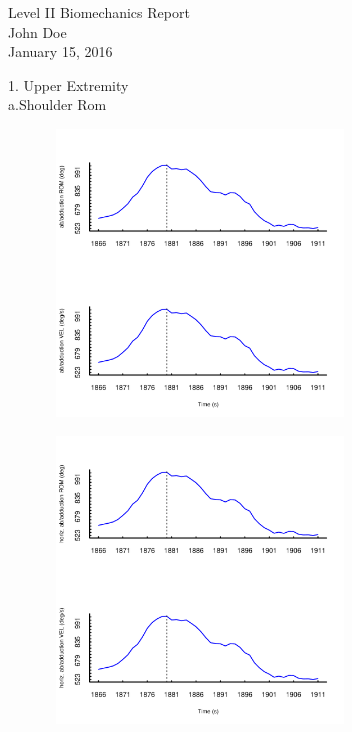 \documentclass{article}\usepackage[]{graphicx}\usepackage[]{color}
\newenvironment{knitrout}{}{} %
\begin{document}
\begin{flushleft}
Level II Biomechanics Report\\John Doe\\   January 15, 2016\\
\end{flushleft}
1. Upper Extremity\\  \qquad         a.Shoulder Rom

\begin{knitrout}
\color{fgcolor}

\includegraphics[width=4in,height=3in]{figure/latex-unnamed-chunk-1-1} \hfill{}



\end{knitrout}
\begin{knitrout}
\color{fgcolor}

\includegraphics[width=4in,height=3in]{figure/latex-unnamed-chunk-2-1} \hfill{}



\end{knitrout}
\end{document}
